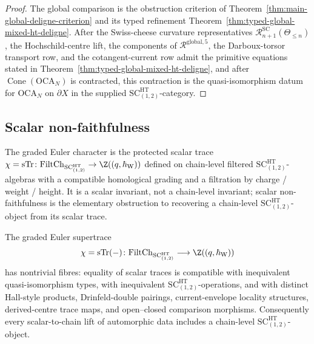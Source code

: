\begin{proof}
The global comparison is the obstruction criterion of
Theorem~\ref{thm:main-global-deligne-criterion} and its typed
refinement Theorem~\ref{thm:typed-global-mixed-ht-deligne}.  After the
Swiss-cheese curvature representatives
\(\mathcal R^{\mathrm{SC}}_{n+1}(\Theta_{\le n})\), the
Hochschild-centre lift, the components of
\(\mathcal R^{\mathrm{global},5}\), the Darboux-torsor transport row,
and the cotangent-current row admit the primitive equations stated in
Theorem~\ref{thm:typed-global-mixed-ht-deligne}, and after
\(\operatorname{Cone}(\mathrm{OCA}_N)\) is contracted,
this contraction is the quasi-isomorphism datum for \(\mathrm{OCA}_N\)
on \(\partial X\) in the supplied
\(\mathrm{SC}^{\mathrm{HT}}_{(1,2)}\)-category.
\end{proof}

\subsection{Scalar non-faithfulness}
\label{ssec:scalar-non-faithfulness}

The graded Euler character is the protected scalar trace
\(\chi=\operatorname{sTr}\colon\mathrm{FiltCh}_{
\mathrm{SC}^{\mathrm{HT}}_{(1,2)}}\to\Z((q,\hbar_{\mathrm{W}}))\) defined on
chain-level filtered \(\mathrm{SC}^{\mathrm{HT}}_{(1,2)}\)-algebras with
a compatible homological grading and a filtration by charge / weight /
height.  It is a scalar invariant, not a chain-level invariant; scalar
non-faithfulness is the elementary obstruction to recovering a chain-level
\(\mathrm{SC}^{\mathrm{HT}}_{(1,2)}\)-object from its scalar trace.

\begin{lem}\label{lem:scalar-non-faithfulness}
The graded Euler supertrace
\[
  \chi=\operatorname{sTr}(-)\colon
  \mathrm{FiltCh}_{\mathrm{SC}^{\mathrm{HT}}_{(1,2)}}
  \longrightarrow\Z((q,\hbar_{\mathrm{W}}))
\]
has nontrivial fibres: equality of scalar traces is compatible with
inequivalent quasi-isomorphism types, with inequivalent
\(\mathrm{SC}^{\mathrm{HT}}_{(1,2)}\)-operations, and with distinct
Hall-style products, Drinfeld-double pairings, current-envelope
locality structures, derived-centre trace maps, and open--closed
comparison morphisms.  Consequently every scalar-to-chain lift of
automorphic data includes a chain-level
\(\mathrm{SC}^{\mathrm{HT}}_{(1,2)}\)-object.
\end{lem}

